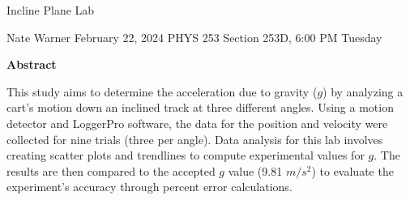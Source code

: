 \documentclass{report}
\title{\Huge{}}
\author{\huge{Nathan Warner}}
\date{\huge{}}
\begin{document}
    \begin{center}
        \begin{Huge}
            Incline Plane Lab
        \end{Huge}
        \begin{Large}
            \bigbreak \noindent 
            Nate Warner
            \smallbreak \noindent
            February 22, 2024
            \smallbreak \noindent
            PHYS 253
            \bigbreak \noindent 
            Section 253D, 6:00 PM Tuesday 
        \end{Large}
    \end{center}
    \pagebreak 
    \tableofcontents
    \pagebreak \bigbreak \noindent 
    \begin{center}
    \textbf{Abstract}
    \end{center}
    \begin{adjustwidth}{.3in}{.3in}
        \hspace{\parindent} This study aims to determine the acceleration due to gravity ($g$) by analyzing a cart's motion down an inclined track at three different angles. Using a motion detector and LoggerPro software, the data for the position and velocity were collected for nine trials (three per angle). Data analysis for this lab involves creating scatter plots and trendlines to compute experimental values for $g$. The results are then compared to the accepted $g$ value (9.81 $m/s^{2}$) to evaluate the experiment's accuracy through percent error calculations. 
    \end{adjustwidth}
\end{document}
